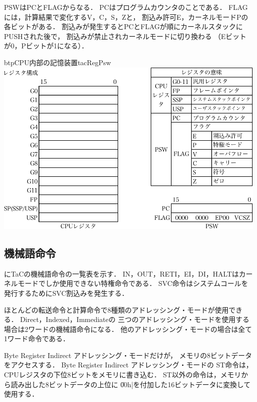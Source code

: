 PSWはPCとFLAGからなる．
PCはプログラムカウンタのことである．
FLAGには，計算結果で変化するV，C，S，Zと，
割込み許可E，カーネルモードPの各ビットがある．
割込みが発生するとPCとFLAGが順にカーネルスタックにPUSHされた後で，
割込みが禁止されカーネルモードに切り換わる
（Eビットが0，Pビットが1になる）．

\begin{myfig}{btp}{CPU内部の記憶装置}{tacRegPsw}
  \includegraphics[scale=0.7]{Tbl/TaC7a-instruction-p1-3-crop.pdf}
\end{myfig}

\subsection{機械語命令}
にTaCの機械語命令の一覧表を示す．
IN，OUT，RETI，EI，DI，HALTはカーネルモードでしか使用できない特権命令である．
SVC命令はシステムコールを発行するためにSVC割込みを発生する．

ほとんどの転送命令と計算命令で8種類のアドレッシング・モードが使用できる．
Direct，Indexed，Immediateの
三つのアドレッシング・モードを使用する場合は2ワードの機械語命令になる．
他のアドレッシング・モードの場合は全て1ワード命令である．

Byte Register Indirect アドレッシング・モードだけが，
メモリの8ビットデータをアクセスする．
Byte Register Indirect アドレッシング・モードの
ST命令は，CPUレジスタの下位8ビットをメモリに書き込む．
ST以外の命令は，メモリから読み出した8ビットデータの上位に
\|00h|を付加した16ビットデータに変換して使用する．

